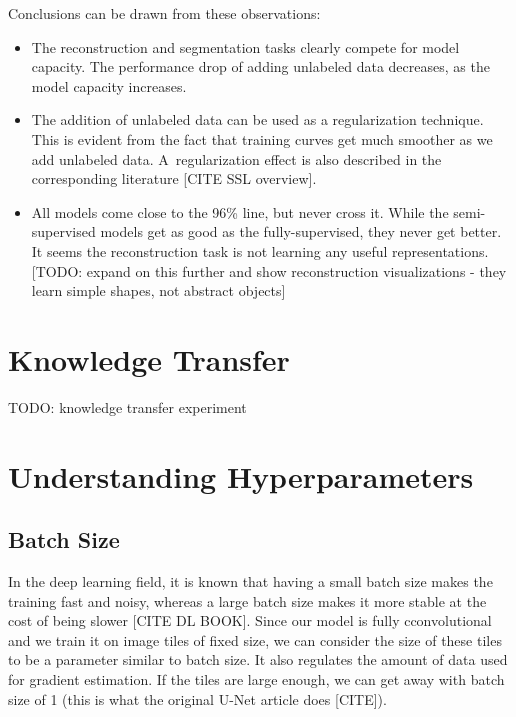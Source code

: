 Conclusions can be drawn from these observations:

\begin{itemize}
    \item The reconstruction and segmentation tasks clearly compete for model capacity. The performance drop of adding unlabeled data decreases, as the model capacity increases.
    \item The addition of unlabeled data can be used as a regularization technique. This is evident from the fact that training curves get much smoother as we add unlabeled data. A~regularization effect is also described in the corresponding literature [CITE SSL overview].
    \item All models come close to the 96\% line, but never cross it. While the semi-supervised models get as good as the fully-supervised, they never get better. It seems the reconstruction task is not learning any useful representations. [TODO: expand on this further and show reconstruction visualizations - they learn simple shapes, not abstract objects]
\end{itemize}



\section{Knowledge Transfer}
\label{sec:KnowledgeTransfer}

TODO: knowledge transfer experiment


\section{Understanding Hyperparameters}
\label{sec:UnderstandingHyperparameters}


\subsection{Batch Size}
\label{sec:BatchSize}

In the deep learning field, it is known that having a small batch size makes the training fast and noisy, whereas a large batch size makes it more stable at the cost of being slower [CITE DL BOOK]. Since our model is fully cconvolutional and we train it on image tiles of fixed size, we can consider the size of these tiles to be a parameter similar to batch size. It also regulates the amount of data used for gradient estimation. If the tiles are large enough, we can get away with batch size of 1 (this is what the original U-Net article does [CITE]).

